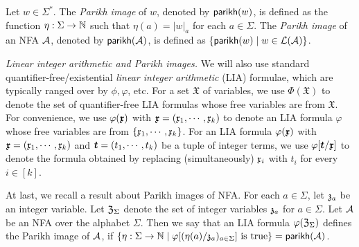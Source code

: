 Let $w \in \Sigma^*$. The \emph{Parikh image} of $w$, denoted by $\mathsf{parikh}(w)$, is defined as the function $\eta: \Sigma \rightarrow \mathbb{N}$ such that $\eta(a) = |w|_a$ for each $a \in \Sigma$. The \emph{Parikh image} of an NFA $\mathcal{A}$, denoted by $\mathsf{parikh}(\mathcal{A})$, is defined as $\{\mathsf{parikh}(w) \mid w \in \mathcal{L}(\mathcal{A})\}$.






\medskip
\noindent 
\emph{Linear integer arithmetic and Parikh images.}
We will also use standard quantifier-free/existential \emph{linear integer arithmetic} (LIA) formulae, which are typically ranged over by $\phi, \varphi$, etc. 
For a set $\mathfrak{X}$ of variables, we use $\Phi(\mathfrak{X})$ to denote the set of quantifier-free LIA formulas whose free variables are from $\mathfrak{X}$. 
For convenience, we use $\varphi(\vec{\anivar})$ with $\myvec{\anivar} = (\anivar_1, \cdots, \anivar_k)$ to denote an LIA formula $\varphi$ whose free variables are from $\{\mathfrak{x}_1, \cdots, \mathfrak{x}_k\}$. For an LIA formula $\varphi(\vec{\anivar})$ with $\myvec{\anivar} = (\anivar_1, \cdots, \anivar_k)$ and $\myvec{t} = (t_1, \cdots, t_k)$ be a tuple of integer terms, we use $\varphi[\myvec{t}/\myvec{\anivar}]$ to denote the formula obtained by replacing (simultaneously) $\mathfrak{x}_i$ with $t_i$ for every $i \in [k]$.

At last, we recall a result about Parikh images of NFA. 
For each $a \in \Sigma$, let $\mathfrak{z}_a$ be an integer variable. Let $\mathfrak{Z}_\Sigma$ denote the set of integer variables $\mathfrak{z}_a$ for $a \in \Sigma$. 
Let $\mathcal{A}$ be an NFA over the alphabet $\Sigma$. Then 
we say that an LIA formula $\varphi(\mathfrak{Z}_\Sigma)$ defines the Parikh image of $\mathcal{A}$, if $\{\eta: \Sigma \rightarrow \mathbb{N} \mid \varphi[(\eta(a) /\mathfrak{z}_a)_{a \in \Sigma}] \mbox{ is true}\} = \mathsf{parikh}(\mathcal{A})$. 

